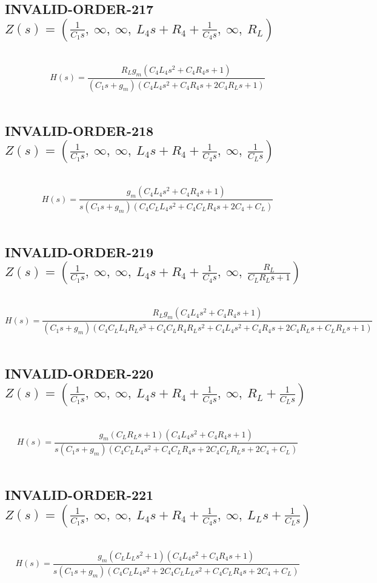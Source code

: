 \documentclass{article}
\begin{document}
\subsection{INVALID-ORDER-217 $Z(s) = \left( \frac{1}{C_{1} s}, \  \infty, \  \infty, \  L_{4} s + R_{4} + \frac{1}{C_{4} s}, \  \infty, \  R_{L}\right)$ } \ 
\textbf{\[H(s) = \frac{R_{L} g_{m} \left(C_{4} L_{4} s^{2} + C_{4} R_{4} s + 1\right)}{\left(C_{1} s + g_{m}\right) \left(C_{4} L_{4} s^{2} + C_{4} R_{4} s + 2 C_{4} R_{L} s + 1\right)}\] } \ 
\subsection{INVALID-ORDER-218 $Z(s) = \left( \frac{1}{C_{1} s}, \  \infty, \  \infty, \  L_{4} s + R_{4} + \frac{1}{C_{4} s}, \  \infty, \  \frac{1}{C_{L} s}\right)$ } \ 
\textbf{\[H(s) = \frac{g_{m} \left(C_{4} L_{4} s^{2} + C_{4} R_{4} s + 1\right)}{s \left(C_{1} s + g_{m}\right) \left(C_{4} C_{L} L_{4} s^{2} + C_{4} C_{L} R_{4} s + 2 C_{4} + C_{L}\right)}\] } \ 
\subsection{INVALID-ORDER-219 $Z(s) = \left( \frac{1}{C_{1} s}, \  \infty, \  \infty, \  L_{4} s + R_{4} + \frac{1}{C_{4} s}, \  \infty, \  \frac{R_{L}}{C_{L} R_{L} s + 1}\right)$ } \ 
\textbf{\[H(s) = \frac{R_{L} g_{m} \left(C_{4} L_{4} s^{2} + C_{4} R_{4} s + 1\right)}{\left(C_{1} s + g_{m}\right) \left(C_{4} C_{L} L_{4} R_{L} s^{3} + C_{4} C_{L} R_{4} R_{L} s^{2} + C_{4} L_{4} s^{2} + C_{4} R_{4} s + 2 C_{4} R_{L} s + C_{L} R_{L} s + 1\right)}\] } \ 
\subsection{INVALID-ORDER-220 $Z(s) = \left( \frac{1}{C_{1} s}, \  \infty, \  \infty, \  L_{4} s + R_{4} + \frac{1}{C_{4} s}, \  \infty, \  R_{L} + \frac{1}{C_{L} s}\right)$ } \ 
\textbf{\[H(s) = \frac{g_{m} \left(C_{L} R_{L} s + 1\right) \left(C_{4} L_{4} s^{2} + C_{4} R_{4} s + 1\right)}{s \left(C_{1} s + g_{m}\right) \left(C_{4} C_{L} L_{4} s^{2} + C_{4} C_{L} R_{4} s + 2 C_{4} C_{L} R_{L} s + 2 C_{4} + C_{L}\right)}\] } \ 
\subsection{INVALID-ORDER-221 $Z(s) = \left( \frac{1}{C_{1} s}, \  \infty, \  \infty, \  L_{4} s + R_{4} + \frac{1}{C_{4} s}, \  \infty, \  L_{L} s + \frac{1}{C_{L} s}\right)$ } \ 
\textbf{\[H(s) = \frac{g_{m} \left(C_{L} L_{L} s^{2} + 1\right) \left(C_{4} L_{4} s^{2} + C_{4} R_{4} s + 1\right)}{s \left(C_{1} s + g_{m}\right) \left(C_{4} C_{L} L_{4} s^{2} + 2 C_{4} C_{L} L_{L} s^{2} + C_{4} C_{L} R_{4} s + 2 C_{4} + C_{L}\right)}\] } \ 
\end{document}
